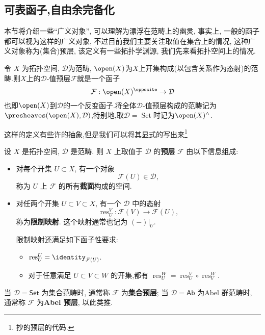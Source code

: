 \subsection{可表函子,自由余完备化}
本节将介绍一些``广义对象'', 可以理解为漂浮在范畴上的幽灵, 事实上, 一般的函子都可以视为这样的广义对象, 不过目前我们主要关注取值在集合上的情况, 这种广义对象称为(集合)预层, 该定义有一些拓扑学渊源, 我们先来看拓扑空间上的情况.
\begin{definition}
    令 $X$ 为拓扑空间, $\mathcal{D}$为范畴, $\open(X)$为$X$上开集构成(以包含关系作为态射)的范畴.则$X$上的$\mathcal{D}$-值预层$\mathcal{F}$就是一个函子
    \[
        \mathcal{F}: \open(X)^{\opposite} \to \mathcal{D}
    \]
    也即$\open(X)$到$\mathcal{D}$的一个反变函子.将全体$\mathcal{D}$-值预层构成的范畴记为$\presheaves(\open(X),\mathcal{D})$,特别地,取$\mathcal{D} = \operatorname{Set}$时记为$\open(X)^{\land}$.
\end{definition}
这样的定义有些许的抽象,但是我们可以将其显式的写出来\footnote{抄的预层的代码.}
\begin{definition}
    设 $X$ 是拓扑空间, $\mathcal{D}$ 是范畴.
    则 $X$ 上取值于 $\mathcal{D}$ 的\textbf{预层} $\mathcal{F}$
    由以下信息组成:
    \begin{itemize}
        \item
            对每个开集 $U \subset X$, 有一个对象
            \[
                \mathcal{F} (U) \in \mathcal{D},
            \]
            称为 $U$ 上 $\mathcal{F}$ 的所有\textbf{截面}构成的空间.
        \item
            对任两个开集 $U \subset V \subset X$, 有一个 $\mathcal{D}$ 中的态射
            \[
                \operatorname{res}_U^V
                \colon \mathcal{F} (V) \to \mathcal{F} (U),
            \]
            称为\textbf{限制映射}.
            这个映射通常也记为 $(-)|_U$.

            限制映射还满足如下函子性要求:
            \begin{itemize}
                \item $\operatorname{res}_U^U = \identity_{\mathcal{F} (U)}$.
                \item 对于任意满足 $U \subset V \subset W$ 的开集,都有 
                $\operatorname{res}_U^W = \operatorname{res}_U^V \circ 
                \operatorname{res}_V^W$.
            \end{itemize}
    \end{itemize}
    当 $\mathcal{D} = \mathsf{Set}$ 为集合范畴时,
    通常称 $\mathcal{F}$ 为\textbf{集合预层};
    当 $\mathcal{D} = \mathsf{Ab}$ 为Abel 群范畴时,
    通常称 $\mathcal{F}$ 为\textbf{Abel 预层}, 以此类推.
\end{definition}
